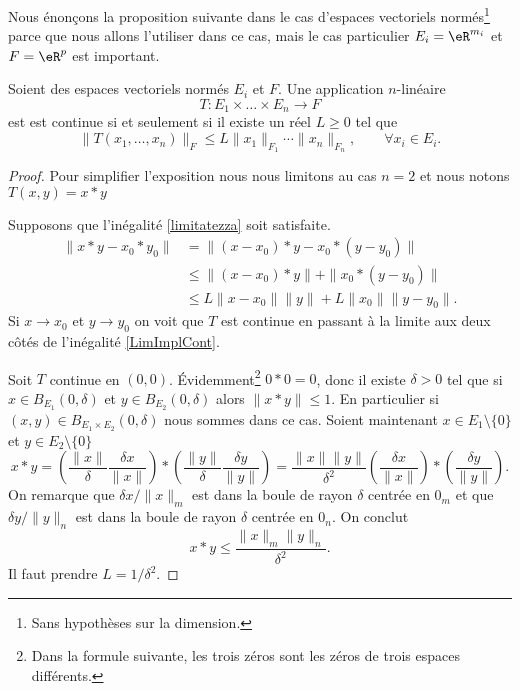 Nous énonçons la proposition suivante dans le cas d'espaces vectoriels normés\footnote{Sans hypothèses sur la dimension.} parce que nous allons l'utiliser dans ce cas, mais le cas particulier \( E_i=\eR^{m_i}\) et \( F=\eR^p\) est important.
\begin{proposition} \label{PropUADlSMg}
	Soient des espaces vectoriels normés \( E_i\) et \( F\). Une application \( n\)-linéaire
	\begin{equation}
		T\colon E_1\times\ldots\times E_n\to F
	\end{equation}
	est est continue si et seulement si il existe un réel \( L\geq 0\) tel que
	\begin{equation}\label{limitatezza}
		\|T(x_1, \ldots,x_n)\|_F\leq L \|x_1\|_{F_1}\cdots\|x_n\|_{F_n}, \qquad \forall x_i\in E_i.
	\end{equation}
\end{proposition}

\begin{proof}
	Pour simplifier l'exposition nous nous limitons au cas \( n=2\) et nous notons \( T(x,y)=x*y\)

	Supposons que l'inégalité \eqref{limitatezza} soit satisfaite.
	\begin{equation}\label{LimImplCont}
		\begin{aligned}
			\|x*y-x_0*y_0\| & =\|(x-x_0)*y-x_0*(y-y_0)\|                \\
			                & \leq \|(x-x_0)*y\|+\|x_0*(y-y_0)\|        \\
			                & \leq L\|x-x_0\|\|y\| + L\|x_0\|\|y-y_0\|.
		\end{aligned}
	\end{equation}
	Si \( x\to x_0\) et \( y\to y_0\)  on voit que \( T\) est continue en passant à la limite aux deux côtés de l'inégalité \eqref{LimImplCont}.

	Soit \( T\) continue en \( (0,0)\). Évidemment\footnote{Dans la formule suivante, les trois zéros sont les zéros de trois espaces différents.} \( 0*0=0\), donc il existe \( \delta>0\) tel que si \( x\in B_{E_1}(0,\delta)\) et \( y\in B_{E_2}(0,\delta)\) alors \( \|x*y\|\leq 1\). En particulier si \( (x,y)\in B_{E_1\times E_2}(0,\delta)\) nous sommes dans ce cas. Soient maintenant  \( x\in E_1\setminus\{ 0 \}\)  et \( y\in E_2\setminus\{ 0\}\)
	\begin{equation}
		x*y =\left(\frac{\|x\|}{\delta}\frac{\delta x}{\|x\|}\right)*\left(\frac{\|y\|}{\delta}\frac{\delta y}{\|y\|}\right)
		=\frac{\|x\|\|y\|}{\delta^2} \left(\frac{\delta x}{\|x\|}\right)*\left(\frac{\delta y}{\|y\|}\right).
	\end{equation}
	On remarque que \( \delta x/\|x\|_m\) est dans la boule de rayon \( \delta\) centrée en \( 0_m\) et que \( \delta y/\|y\|_n\) est dans la boule de rayon \( \delta\) centrée en \( 0_n\). On conclut
	\[
		x*y\leq \frac{\|x\|_m\|y\|_n}{\delta^2}.
	\]
	Il faut prendre \( L=1/\delta^2\).
\end{proof}

